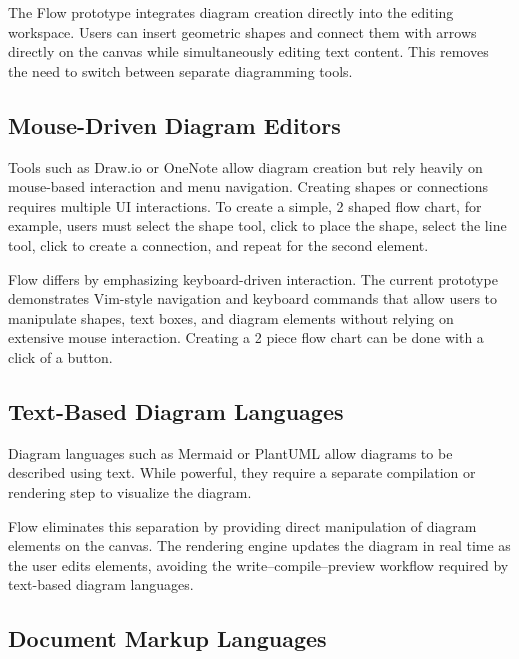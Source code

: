 \documentclass[12pt, titlepage]{article}
\begin{document}
\vspace{1em}

The Flow prototype integrates diagram creation directly into the editing workspace.
Users can insert geometric shapes and connect them with arrows directly on the canvas
while simultaneously editing text content. This removes the need to switch between separate
diagramming tools.

\subsection{Mouse-Driven Diagram Editors}

Tools such as Draw.io or OneNote allow diagram creation but rely heavily on mouse-based
interaction and menu navigation. Creating shapes or connections requires multiple UI interactions.
To create a simple, 2 shaped flow chart, for example, users must select the shape tool, 
click to place the shape, select the line tool, click to create a connection, and repeat for 
the second element.

\vspace{1em}

Flow differs by emphasizing keyboard-driven interaction. The current prototype demonstrates
Vim-style navigation and keyboard commands that allow users to manipulate shapes, text boxes,
and diagram elements without relying on extensive mouse interaction. Creating a 2 piece flow 
chart can be done with a click of a button.

\subsection{Text-Based Diagram Languages}

Diagram languages such as Mermaid or PlantUML allow diagrams to be described using text. While
powerful, they require a separate compilation or rendering step to visualize the diagram.

\vspace{1em}

Flow eliminates this separation by providing direct manipulation of diagram elements on the
canvas. The rendering engine updates the diagram in real time as the user edits elements, avoiding
the write–compile–preview workflow required by text-based diagram languages.

\subsection{Document Markup Languages}
\end{document}

